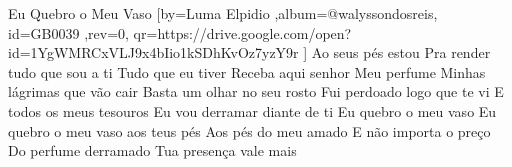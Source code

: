 \beginsong
{Eu Quebro o Meu Vaso %
}[by={Luma Elpidio %
},album={@walyssondosreis},
id={GB0039 %
},rev={0}, %
qr={https://drive.google.com/open?id=1YgWMRCxVLJ9x4bIio1kSDhKvOz7yzY9r %
}]
\beginverse*
Ao seus pés estou
Pra render tudo que sou a ti
Tudo que eu tiver
Receba aqui senhor
Meu perfume
Minhas lágrimas que vão cair
\endverse
\beginverse*
Basta um olhar no seu rosto
Fui perdoado logo que te vi
E todos os meus tesouros
Eu vou derramar diante de ti
\endverse
\beginchorus
Eu quebro o meu vaso
Eu quebro o meu vaso aos teus pés
Aos pés do meu amado
\endchorus
\beginverse*
E não importa o preço
Do perfume derramado
Tua presença vale mais
\endverse
\vspace{4em} %
\begin{comment}
\lstset{basicstyle=\scriptsize\bf} %
\tab{Solo 1}
\begin{lstlisting}
E|-----------------------------------------------------|
B|-----------------------------------------------------|
G|-----------------------------------------------------|
D|-----------------------------------------------------|
A|-----------------------------------------------------|
E|-----------------------------------------------------|
\end{lstlisting}
\end{comment}
 
